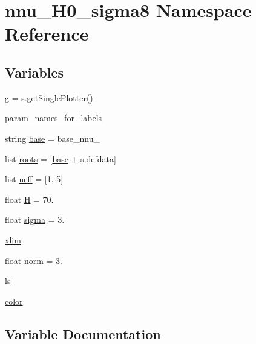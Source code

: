 \hypertarget{namespacennu__H0__sigma8}{}\section{nnu\+\_\+\+H0\+\_\+sigma8 Namespace Reference}
\label{namespacennu__H0__sigma8}
\subsection*{Variables}
\begin{DoxyCompactItemize}
\item 
\mbox{\hyperlink{namespacennu__H0__sigma8_ac6ad4143030fb221def3e2cb5ae880c8}{g}} = s.\+get\+Single\+Plotter()
\item 
\mbox{\hyperlink{namespacennu__H0__sigma8_aef69e5e135d7f8b39c45ced5f2335673}{param\+\_\+names\+\_\+for\+\_\+labels}}
\item 
string \mbox{\hyperlink{namespacennu__H0__sigma8_a89a48ed754fb8a89944329b564b4ac5c}{base}} = \textquotesingle{}base\+\_\+nnu\+\_\+\textquotesingle{}
\item 
list \mbox{\hyperlink{namespacennu__H0__sigma8_ad3fea3b8d1c3eada02e2526bac190fc6}{roots}} = \mbox{[}\mbox{\hyperlink{namespacennu__H0__sigma8_a89a48ed754fb8a89944329b564b4ac5c}{base}} + s.\+defdata\mbox{]}
\item 
list \mbox{\hyperlink{namespacennu__H0__sigma8_a80730310550d43c8b8e06f695c17a586}{neff}} = \mbox{[}1, 5\mbox{]}
\item 
float \mbox{\hyperlink{namespacennu__H0__sigma8_ac2decd357b599f451db259a03287f400}{H}} = 70.
\item 
float \mbox{\hyperlink{namespacennu__H0__sigma8_ab1bfe429d48bb5fdf7c62f2d25ad7651}{sigma}} = 3.
\item 
\mbox{\hyperlink{namespacennu__H0__sigma8_af8c32c2065f67ffbc86e37a67b53c242}{xlim}}
\item 
float \mbox{\hyperlink{namespacennu__H0__sigma8_a5f10b6cced50c4b4d14d27c68ebe84a2}{norm}} = 3.
\item 
\mbox{\hyperlink{namespacennu__H0__sigma8_a82054c72132619171926f4849372cedb}{ls}}
\item 
\mbox{\hyperlink{namespacennu__H0__sigma8_a03d984f9f30eb44f71e359af92b8a395}{color}}
\end{DoxyCompactItemize}


\subsection{Variable Documentation}
\mbox{\label{namespacennu__H0__sigma8_a89a48ed754fb8a89944329b564b4ac5c}} 
